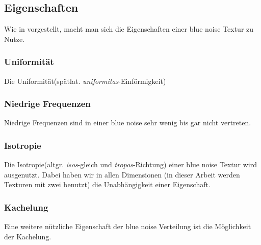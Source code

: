\subsection{Eigenschaften}

Wie in \cite{Pet17} vorgestellt, macht man sich die Eigenschaften einer
blue noise Textur zu Nutze.
\subsubsection{Uniformität}
Die Uniformität(spätlat. \textit{uniformitas}-Einförmigkeit) 

\subsubsection{Niedrige Frequenzen}
Niedrige Frequenzen sind in einer blue noise sehr wenig bis gar nicht 
vertreten.

\subsubsection{Isotropie}
Die Isotropie(altgr. \textit{isos}-gleich und \textit{tropos}-Richtung)
einer blue noise Textur wird ausgenutzt. Dabei haben wir in allen
Dimensionen (in dieser Arbeit werden Texturen mit zwei benutzt) 
die Unabhängigkeit einer Eigenschaft. 

\subsubsection{Kachelung}
Eine weitere nützliche Eigenschaft der blue noise Verteilung ist die 
Möglichkeit der Kachelung. 